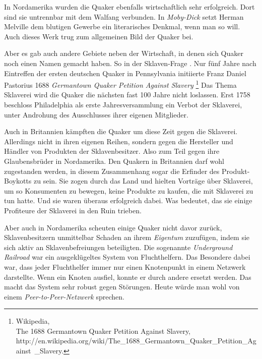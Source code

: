 \medskip

In Nordamerika wurden die Quaker ebenfalls wirtschaftlich sehr erfolgreich. Dort
sind sie untrennbar mit dem Walfang  verbunden. In
\textit{Moby-Dick} setzt
Herman Melville  dem blutigen Gewerbe ein
literarisches Denkmal, wenn man so
will. Auch dieses Werk trug zum allgemeinen Bild der Quaker bei.

\medskip

Aber es gab auch andere Gebiete neben der Wirtschaft, in denen sich Quaker noch
einen
Namen gemacht haben. So in der Sklaven-Frage . Nur fünf Jahre
nach Eintreffen
der ersten deutschen Quaker in Pennsylvania initiierte Franz Daniel Pastorius
1688 \textit{Germantown Quaker Petition Against Slavery}
\footnote{Wikipedia,
\\The 1688 Germantown Quaker Petition Against Slavery,
\\http://en.wikipedia.org/wiki/The\_1688\_Germantown\_Quaker\_Petition\_Against\
\_Slavery.} Das Thema Sklaverei wird die Quaker die nächsten fast 100 Jahre
nicht
loslassen. Erst 1758 beschloss Philadelphia  als erste
Jahresversammlung ein Verbot der Sklaverei,
unter Androhung des Ausschlusses ihrer eigenen Mitglieder.

\medskip

Auch in Britannien kämpften die Quaker um diese Zeit gegen die Sklaverei.
Allerdings nicht in ihren eigenen Reihen, sondern gegen die Hersteller
und Händler von Produkten der Sklavenbesitzer. Also zum Teil gegen ihre
Glaubensbrüder in Nordamerika. Den Quakern in Britannien darf wohl zugestanden
werden, in diesem Zusammenhang sogar die Erfinder des Produkt-Boykotts
\index{Boykott} zu sein.
Sie zogen durch das Land und hielten Vorträge über Sklaverei, um so Konsumenten
zu
bewegen, keine Produkte zu kaufen, die mit Sklaverei zu tun hatte. Und sie
waren überaus erfolgreich dabei. Was bedeutet, das sie einige Profiteure der
Sklaverei in den Ruin trieben.

\medskip

Aber auch in Nordamerika  scheuten einige Quaker nicht
davor zurück,
Sklavenbesitzern unmittelbar Schaden an ihrem \textit{Eigentum} zuzufügen, indem
sie sich
aktiv an Sklavenbefreiungen beteiligten. Die sogenannte
\textit{Underground Railroad}  war ein
ausgeklügeltes System von Fluchthelfern. Das
Besondere dabei war, dass jeder Fluchthelfer 
immer
nur einen Knotenpunkt in einem
Netzwerk darstellte. Wenn ein Knoten ausfiel, konnte er durch andere ersetzt
werden. Das macht das System sehr robust gegen Störungen. Heute würde man
wohl
von einem \textit{Peer-to-Peer-Netzwerk} sprechen.

